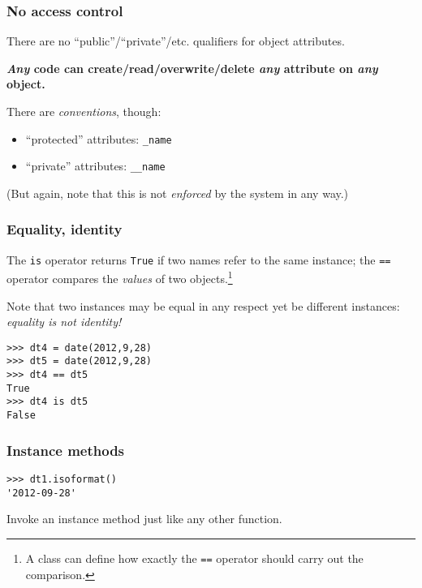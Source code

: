 \documentclass[english,serif,mathserif,xcolor=pdftex,dvipsnames,table]{beamer}
\begin{document}
\begin{frame}
  \frametitle{No access control}
  There are no ``public''/``private''/etc. qualifiers for object
  attributes.

  \+
  \textbf{\emph{Any} code can create/read/overwrite/delete \emph{any} attribute on
    \emph{any} object.}

  \+
  There are \emph{conventions}, though:
  \begin{itemize}
  \item ``protected'' attributes: \texttt{\_name}
  \item ``private'' attributes: \texttt{\_\_name}
  \end{itemize}
  (But again, note that this is not \emph{enforced} by the system in
  any way.)

\end{frame}


\begin{frame}
  \frametitle{Equality, identity}
  The \texttt{is} operator returns \texttt{True} if two names refer to
  the same instance; the \texttt{==} operator compares the
  \emph{values} of two objects.\footnote{A class can define how
    exactly the \texttt{==} operator should carry out the comparison.}

  \+
  Note that two instances may be equal in any respect yet be
  different instances: \emph{equality is not identity!}
\begin{lstlisting}
>>> dt4 = date(2012,9,28)
>>> dt5 = date(2012,9,28)
>>> dt4 == dt5
True
>>> dt4 is dt5
False
\end{lstlisting}
\end{frame}


\begin{frame}[fragile]
  \frametitle{Instance methods}
\begin{lstlisting}[showstringspaces=false]
>>> dt1.isoformat()
'2012-09-28'
\end{lstlisting}

  \+
  Invoke an instance method just like any other function.
\end{frame}
\end{document}
